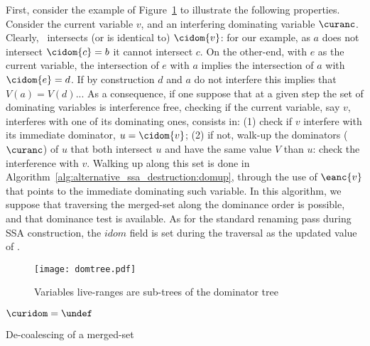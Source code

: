 First, consider the example of Figure~\ref{fig:alternative_ssa_destruction:fig:domtree} to illustrate the following properties. Consider the current variable $v$,  and an interfering dominating variable $\curanc$. Clearly, \curanc\ intersects (or is identical to) $\cidom{v}$: for our example, as $a$ does not intersect $\cidom{c}=b$ it cannot intersect $c$. On the other-end, with $e$ as the current variable, the intersection of $e$ with $a$ implies the intersection of $a$ with $\cidom{e}=d$. If by construction $d$ and $a$ do not interfere this implies that $V(a)=V(d)$... 
%
As a consequence, if one suppose that at a given step the set of dominating variables is interference free, checking if the current variable, say $v$, interferes with one of its dominating ones, consists in: (1) check if $v$ interfere with its immediate dominator, $u=\cidom{v}$; (2) if not, walk-up the dominators ($\curanc$) of $u$ that both intersect $u$ and have the same value $V$ than $u$: check the interference with $v$. Walking up along this set is done in Algorithm~\ref{alg:alternative_ssa_destruction:domup}, through the use of $\eanc{v}$ that points to the immediate dominating such variable. In this algorithm, we suppose that traversing the merged-set along the dominance order is possible, and that dominance test is available. As for the standard renaming pass during SSA construction, the $\textit{idom}$ field is set during the traversal as the updated value of \curidom.  


\begin{figure}
\texttt{[image: domtree.pdf]}
\caption{\label{fig:alternative_ssa_destruction:fig:domtree}Variables live-ranges are sub-trees of the dominator tree}
\end{figure}

\begin{algorithm}[h]
$\curidom=\undef$\;
\caption{\label{alg:alternative_ssa_destruction:domup} De-coalescing of a merged-set}
\end{algorithm}

